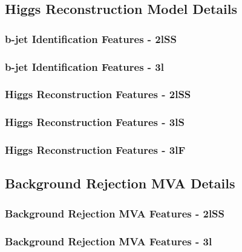 
\subsection{Higgs Reconstruction Model Details}
\label{subsec:recoApx}

\subsubsection{b-jet Identification Features - 2lSS}


\subsubsection{b-jet Identification Features - 3l}


\subsubsection{Higgs Reconstruction Features - 2lSS}


\subsubsection{Higgs Reconstruction Features - 3lS}


\subsubsection{Higgs Reconstruction Features - 3lF}



\subsection{Background Rejection MVA Details}
\label{subsec:sigBkgApx}

\subsubsection{Background Rejection MVA Features - 2lSS}
\label{apx:sigBkg2lSS}


\subsubsection{Background Rejection MVA Features - 3l}
\label{apx:sigBkg3l}


